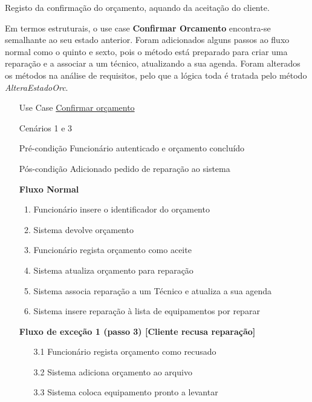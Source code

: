 \documentclass[../relatorio.tex]{subfiles}
\begin{document}
Registo da confirmação do orçamento, aquando da aceitação do cliente.

Em termos estruturais, o use case \textbf{Confirmar Orcamento} encontra-se semalhante ao seu estado anterior.
Foram adicionados alguns passos ao fluxo normal como o quinto e sexto, pois o método está preparado para 
criar uma reparação e a associar a um técnico, atualizando a sua agenda.
Foram alterados os métodos na análise de requisitos, pelo que a lógica toda é tratada pelo método \textit{AlteraEstadoOrc}.
\begin{itemize}
    \item[Use Case] {\underline{Confirmar orçamento}}
    \item[Cenários] {1 e 3}
    \item[Pré-condição] {Funcionário autenticado e orçamento concluído}
    \item[Pós-condição] {Adicionado pedido de reparação ao sistema}
          \begin{flushleft}
              \textbf{Fluxo Normal}
          \end{flushleft}
          \begin{enumerate}
              \item Funcionário insere o identificador do orçamento 
              \item Sistema devolve orçamento
              \item Funcionário regista orçamento como aceite
              \item Sistema atualiza orçamento para reparação 
              \item Sistema associa reparação a um Técnico e atualiza a sua agenda 
              \item Sistema insere reparação à lista de equipamentos por reparar
          \end{enumerate}
          \begin{flushleft}
              \textbf{Fluxo de exceção 1 (passo 3) [Cliente recusa reparação]}
          \end{flushleft}
          \begin{itemize}
              \item[3.1]{Funcionário regista orçamento como recusado}
              \item[3.2]{Sistema adiciona orçamento ao arquivo}
              \item[3.3]{Sistema coloca equipamento pronto a levantar}
          \end{itemize}
\end{itemize}
\end{document}
